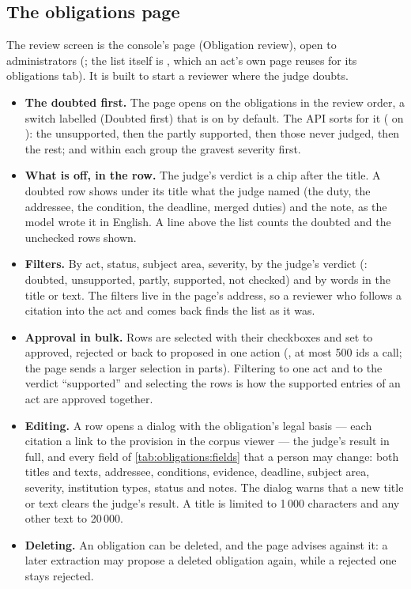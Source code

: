 \subsection{The obligations page}

The review screen is the console's page  (Obligation review), open to
administrators (; the list itself is
, which an act's own page reuses for its
obligations tab). It is built to start a reviewer where the judge doubts.

\begin{itemize}
  \item \textbf{The doubted first.} The page opens on the  obligations in the
    review order, a switch labelled  (Doubted first) that is on by
    default. The API sorts for it ( on ):
    the unsupported, then the partly supported, then those never judged, then the rest; and
    within each group the gravest severity first.
  \item \textbf{What is off, in the row.} The judge's verdict is a chip after the title. A
    doubted row shows under its title what the judge named (the duty, the addressee, the
    condition, the deadline, merged duties) and the note, as the model wrote it in English.
    A line above the list counts the doubted and the unchecked rows shown.
  \item \textbf{Filters.} By act, status, subject area, severity, by the judge's verdict
    (: doubted, unsupported, partly, supported, not checked) and by words in
    the title or text. The filters live in the page's address, so a reviewer who follows a
    citation into the act and comes back finds the list as it was.
  \item \textbf{Approval in bulk.} Rows are selected with their checkboxes and set to
    approved, rejected or back to proposed in one action
    (, at most 500 ids a call; the page sends a larger
    selection in parts). Filtering to one act and to the verdict \enquote{supported} and
    selecting the rows is how the supported entries of an act are approved together.
  \item \textbf{Editing.} A row opens a dialog with the obligation's legal basis --- each
    citation a link to the provision in the corpus viewer --- the judge's result in full,
    and every field of \cref{tab:obligations:fields} that a person may change: both titles
    and texts, addressee, conditions, evidence, deadline, subject area, severity,
    institution types, status and notes. The dialog warns that a new title or text clears
    the judge's result. A title is limited to 1\,000 characters and any other text to
    20\,000.
  \item \textbf{Deleting.} An obligation can be deleted, and the page advises against it: a
    later extraction may propose a deleted obligation again, while a rejected one stays
    rejected.
\end{itemize}


